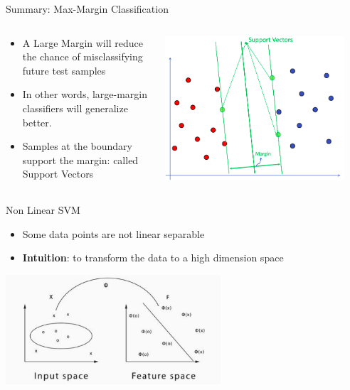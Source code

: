 \documentclass[aspectratio=169, 14pt]{beamer}
\begin{document}
\begin{frame}[t]{Summary: Max-Margin Classification​}
\begin{columns}
	\begin{column}{0.55\textwidth}
        \begin{itemize}
	\item A Large Margin will reduce the chance of misclassifying future test samples
	\item In other words, large-margin classifiers will generalize better.​
        \item Samples at the boundary support the margin: called Support Vectors
	\end{itemize}
	\end{column}
	\begin{column}{0.45\textwidth}
		\vskip-0.5cm
		\includegraphics[width=0.9\textwidth]{SVM_NonLinear_Images/AIML_SVM_IMG7.png}
        \end{column}
\end{columns}

\end{frame}


\begin{frame}[t]{Non Linear SVM}
\begin{itemize}
  \item Some data points are not linear separable
  \item \textbf{Intuition}: to transform the data to a high dimension space
\end{itemize}
\center
\includegraphics[width=0.6\textwidth]{SVM_NonLinear_Images/AIML_SVM_IMG8.png}
\end{frame}
\end{document}
